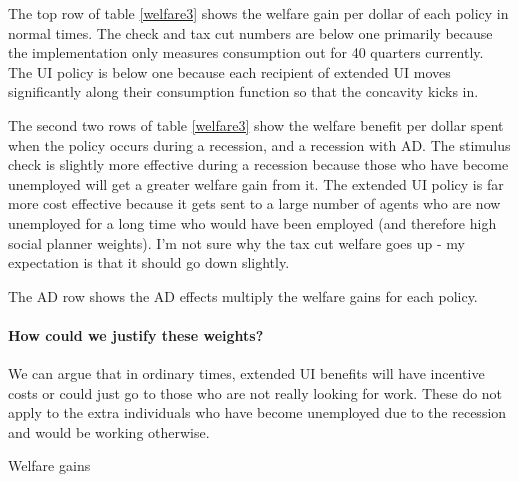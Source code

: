 \documentclass[11pt]{article}
\begin{document}
	The top row of table \ref{welfare3} shows the welfare gain per dollar of each policy in normal times. The check and tax cut numbers are below one primarily because the implementation only measures consumption out for 40 quarters currently. The UI policy is below one because each recipient of extended UI moves significantly along their consumption function so that the concavity kicks in.
	
	The second two rows of table \ref{welfare3} show the welfare benefit per dollar spent when the policy occurs during a recession, and a recession with AD. The stimulus check is slightly more effective during a recession because those who have become unemployed will get a greater welfare gain from it. The extended UI policy is far more cost effective because it gets sent to a large number of agents who are now unemployed for a long time who would have been employed (and therefore high social planner weights). I'm not sure why the tax cut welfare goes up - my expectation is that it should go down slightly.
	
	The AD row shows the AD effects multiply the welfare gains for each policy.
	
	\paragraph{How could we justify these weights?}
	We can argue that in ordinary times, extended UI benefits will have incentive costs or could just go to those who are not really looking for work. These do not apply to the extra individuals who have become unemployed due to the recession and would be working otherwise.
	\begin{table} 
	\center
	
	\caption{Welfare gains}
	\label{welfare3}
	\end{table}
	
	
\end{document}
